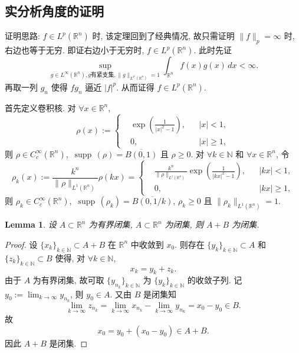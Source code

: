 \documentclass[a4paper,11pt]{article}
\newtheorem{lemma}[theorem]{Lemma}
\theoremstyle{definition}
\def \supp {\mathop\mathrm{\,supp\,}}
\begin{document}
\subsection{实分析角度的证明}

证明思路: $ f \in L^p(\mathbb{R}^n) $ 时, 该定理回到了经典情况,
故只需证明 $ \| f \|_p = \infty $ 时, 右边也等于无穷.
即证右边小于无穷时, $ f \in L^p(\mathbb{R}^n) $.
此时先证
$$
\sup_{g \in L^\infty(\mathbb{R}^n), g \text{有紧支集}, \| g \|_{L^{p'}(\mathbb{R}^n)} = 1}
\int_{\mathbb{R}^n} f(x) g(x) \, dx < \infty.
$$
再取一列 $ g_n $ 使得 $ fg_n $ 逼近 $ |f|^p $. 从而证得 $ f \in L^p(\mathbb{R}^n) $.

首先定义卷积核. 对 $ \forall x \in \mathbb{R}^n $,
$$
\rho(x) := \left\{ \begin{aligned}
&\exp\left( \frac{1}{|x|^2 - 1} \right), && |x| < 1, \\
&0,                             && |x| \geq 1,
\end{aligned}\right.
$$
则 $ \rho \in C_c^\infty(\mathbb{R}^n) $, $ \supp(\rho) = \overline{B(0, 1)} $ 且 $ \rho \geq 0 $.
对 $ \forall k \in \mathbb{N} $ 和 $ \forall x \in \mathbb{R}^n $, 令
$$
\rho_k(x) := \frac{k^n}{\| \rho \|_{L^1(\mathbb{R}^n)}} \rho(kx)
= \left\{ \begin{aligned}
&\frac{k^n}{\| \rho \|_{L^1(\mathbb{R}^n)}} \exp\left( \frac{1}{|kx|^2 - 1} \right), && |kx| < 1, \\
&0,                             && |kx| \geq 1,
\end{aligned}\right.
$$
则 $ \rho_k \in C_c^\infty(\mathbb{R}^n) $, $ \supp(\rho_k) = \overline{B(0, 1/k)} $, $ \rho_k \geq 0 $
且 $ \| \rho_k \|_{L^1(\mathbb{R}^n)} = 1 $.


\begin{lemma} \label{924}
设 $ A \subset \mathbb{R}^n $ 为有界闭集, $ A \subset \mathbb{R}^n $ 为闭集, 则 $ A+B $ 为闭集.
\end{lemma}

\begin{proof}
设 $ \{x_k\}_{k \in \mathbb{N}} \subset A+B $ 在 $ \mathbb{R}^n $ 中收敛到 $ x_0 $.
则存在 $ \{y_k\}_{k \in \mathbb{N}} \subset A $ 和 $ \{z_k\}_{k \in \mathbb{N}} \subset B $
使得, 对 $ \forall k \in \mathbb{N} $,
$$
x_k = y_k + z_k.
$$
由于 $ A $ 为有界闭集, 故可取 $ \{y_{n_k}\}_{k \in \mathbb{N}} $ 为 $ \{y_k\}_{k \in \mathbb{N}} $ 的收敛子列.
记 $ y_0 := \lim_{k \to \infty} y_{n_k} $, 则 $ y_0 \in A $. 又由 $ B $ 是闭集知
$$
\lim_{k \to \infty} z_{n_k}
= \lim_{k \to \infty} x_{n_k} - \lim_{k \to \infty} y_{n_k}
= x_0 - y_0
\in B.
$$
故
$$
x_0 = y_0 + (x_0 - y_0) \in A + B.
$$
因此 $ A + B $ 是闭集.
\end{proof}
\end{document}
